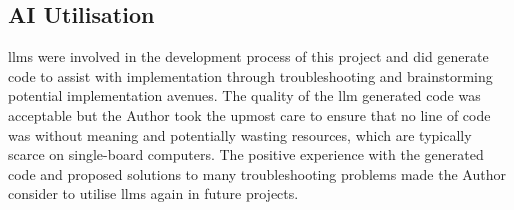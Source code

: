 \subsection{AI Utilisation}\label{subsec:AIEval}
\gls{llm}s were involved in the development process of this project and did generate code to assist with implementation through troubleshooting and brainstorming potential implementation avenues. The quality of the \gls{llm} generated code was acceptable but the Author took the upmost care to ensure that no line of code was without meaning and potentially wasting resources, which are typically scarce on single-board computers. The positive experience with the generated code and proposed solutions to many troubleshooting problems made the Author consider to utilise \gls{llm}s again in future projects.

